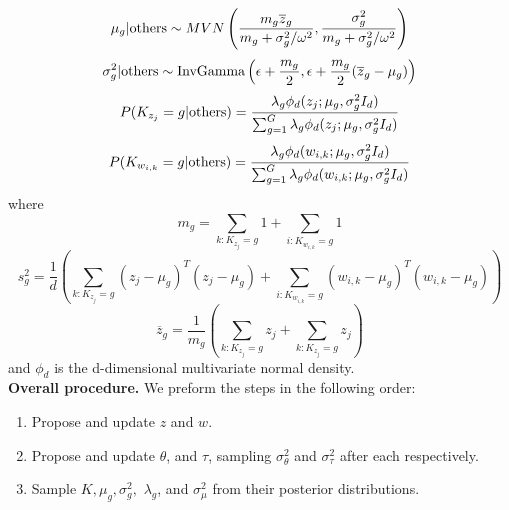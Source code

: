\documentclass[12pt]{article}
\newcommand{\tx}[1]{\textnormal{#1}}
\begin{document}
    $$\mu_{g}|\tx{others}\sim MVN\left(\frac{m_g\overline{z}_g}{m_g+\sigma_g^2/\omega^2},\frac{\sigma_g^2}{m_g+\sigma_g^2/\omega^2}\right)$$ $$\sigma_g^2|\tx{others}\sim \tx{InvGamma}\left(\epsilon+\frac{m_g}{2},\epsilon+\frac{m_g}{2}(\overline{z}_g-\mu_g)\right)$$ $$P(K_{z_j}=g|\tx{others})=\frac{\lambda_{g}\phi_d(z_j;\mu_{g},\sigma_{g}^2I_d)}{\sum_{g=1}^{G}\lambda_{g}\phi_d(z_j;\mu_{g},\sigma_{g}^2I_d)}$$ $$P(K_{w_{i,k}}=g|\tx{others})=\frac{\lambda_{g}\phi_d(w_{i,k};\mu_{g},\sigma_{g}^2I_d)}{\sum_{g=1}^{G}\lambda_{g}\phi_d(w_{i,k};\mu_{g},\sigma_{g}^2I_d)}$$ where $$m_g=\sum_{k:K_{z_j}=g}1+\sum_{i:K_{w_{i,k}}=g}1$$ $$s_g^2=\frac{1}{d}\left(\sum_{k:K_{z_j}=g}(z_j-\mu_g)^T(z_j-\mu_g)+\sum_{i:K_{w_{i,k}}=g}(w_{i,k}-\mu_g)^T(w_{i,k}-\mu_g)\right)$$ $$\overline{z}_g=\frac{1}{m_g}\left(\sum_{k:K_{z_j}=g}z_j+\sum_{k:K_{z_j}=g}z_j\right)$$ and $\phi_d$ is the d-dimensional multivariate normal density.\\ 
  

\textbf{Overall procedure.} We preform the steps in the following order:

\begin{enumerate}
	\item Propose and update $z$ and $w$.
	\item Propose and update $\theta$, and $\tau$, sampling $\sigma_\theta^2$ and $\sigma_\tau^2$ after each respectively.
	\item Sample $K,\mu_{g},\sigma_{g}^2,$ $\lambda_{g}$, and $\sigma_\mu^2$ from their posterior distributions.
\end{enumerate}
\end{document}
